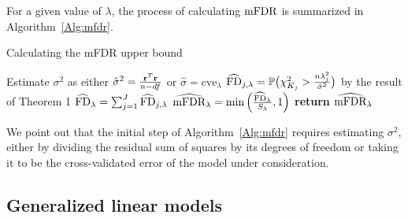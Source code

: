 For a given value of $\lambda$, the process of calculating $\textrm{mFDR}$ is summarized in Algorithm~\ref{Alg:mfdr}.

\begin{algorithm*}
\caption{Calculating the mFDR upper bound}\label{Alg:mfdr}
\begin{algorithmic}[10]
\Procedure{}{}
	\State Estimate $\sigma^2$ as either $\hat{\sigma}^2 = \frac{\mathbf{r}^T\mathbf{r}}{n - df}$ or $\hat{\sigma} = \text{cve}_{\lambda}$
		\State $\widehat{\textrm{FD}}_{j, \lambda} = \mathbb{P} \big(\chi^2_{K_j} > \frac{n\lambda_j^2}{\hat{\sigma}^2}\big)$  by the result of Theorem 1
	\EndFor
	\State $\widehat{\textrm{FD}}_\lambda =  \sum_{j=1}^{J} \widehat{\textrm{FD}}_{j, \lambda} $
	\State $\widehat{\textrm{mFDR}}_\lambda = \text{min}\left(\frac{\widehat{\textrm{FD}}_\lambda}{S_\lambda}, 1 \right)$
\EndProcedure
\State \textbf{return} $\widehat{\textrm{mFDR}}_\lambda $
\end{algorithmic}
\end{algorithm*}

We point out that the initial step of Algorithm~\ref{Alg:mfdr} requires estimating $\sigma^2$, either by dividing the residual sum of squares by its degrees of freedom or taking it to be the cross-validated error of the model under consideration.  

\subsection{Generalized linear models}


